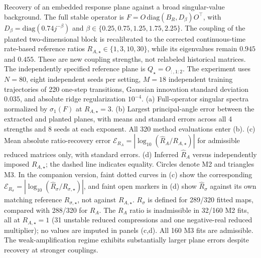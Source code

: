 \caption{Recovery of an embedded response plane against a broad singular-value background.
The full stable operator is $F=O\,\mathrm{diag}(B_R,D_\beta)O^\top$,
with $D_\beta=\mathrm{diag}(0.74 j^{-\beta})$ and
$\beta\in\{0.25,0.75,1.25,1.75,2.25\}$.
The coupling of the planted two-dimensional block is recalibrated to the corrected
continuous-time rate-based reference ratios
$R_{A,\star}\in\{1,3,10,30\}$, while its eigenvalues remain
$0.945$ and $0.455$. These are new coupling strengths, not relabeled historical
matrices. The independently specified reference plane is $Q_\star=O_{:,1:2}$.
The experiment uses $N=80$, eight independent seeds per setting, $M=18$ independent
training trajectories of 220 one-step transitions, Gaussian innovation standard
deviation $0.035$, and absolute ridge regularization $10^{-4}$.
(a) Full-operator singular spectra normalized by $\sigma_1(F)$ at
$R_{A,\star}=3$. (b) Largest principal-angle error between the extracted and
planted planes, with means and standard errors across all 4 strengths and 8
seeds at each exponent. All 320 method evaluations enter (b).
(c) Mean absolute ratio-recovery error
$\mathcal{E}_{R_A}=\left|\log_{10}(\widehat R_A/R_{A,\star})\right|$
for admissible reduced matrices only, with standard errors.
(d) Inferred $\widehat R_A$ versus independently imposed $R_{A,\star}$;
the dashed line indicates equality. Circles denote M2 and triangles M3.
In the companion version, faint dotted curves in (c) show the corresponding
$\mathcal{E}_{R_\sigma}=|\log_{10}(\widehat R_\sigma/R_{\sigma,\star})|$,
and faint open markers in (d) show $\widehat R_\sigma$ against its own
matching reference $R_{\sigma,\star}$, not against $R_{A,\star}$.
$R_\sigma$ is defined for 289/320 fitted maps, compared with 288/320 for $R_A$.
The $R_A$ ratio is inadmissible in 32/160 M2 fits, all at
$R_{A,\star}=1$ (31 unstable reduced compressions and one negative-real
reduced multiplier); no values are imputed in panels (c,d).
All 160 M3 fits are admissible. The weak-amplification regime exhibits
substantially larger plane errors despite recovery at stronger couplings.}
